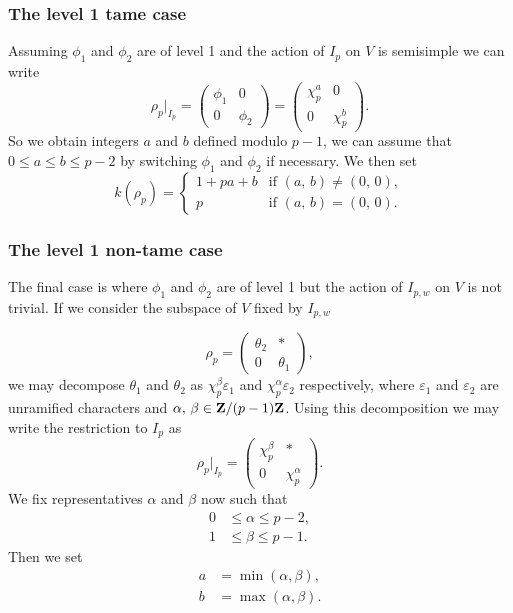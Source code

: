 \documentclass[a4paper,12pt]{article}
\begin{document}
\subsubsection{The level 1 tame case}\label{sec:l1t}
Assuming $\phi_1$ and $\phi_2$ are of level 1 and the action of $I_p$ on $V$ is semisimple we can write
\[
\rho_p |_{I_p} = \begin{pmatrix}
\phi_1 & 0 \\
0      & \phi_2 \end{pmatrix} = \begin{pmatrix}
\chi_p^a & 0 \\
0      & \chi_p^b \end{pmatrix}.
\]
So we obtain integers $a$ and $b$ defined modulo $p-1$, we can assume that $0\le a \le b \le p-2$ by switching $\phi_1$ and $\phi_2$ if necessary.
We then set
\begin{equation}\label{eq:l1t}
k(\rho_p) = \begin{cases}
1 + pa + b & \text{if }(a,\,b) \ne (0,\,0), \\
         p & \text{if }(a,\,b) = (0,\,0).
\end{cases}
\end{equation}


\subsubsection{The level 1 non-tame case}\label{sec:l1nt}
The final case is where $\phi_1$ and $\phi_2$ are of level 1 but the action of $I_{p,w}$ on $V$ is not trivial.
If we consider the subspace of $V$ fixed by $I_{p,w}$

\[
\rho_p = \begin{pmatrix}
\theta_2 & * \\
0        & \theta_1 \end{pmatrix},
\]
we may decompose $\theta_1$ and $\theta_2$ as $\chi_p^\beta \varepsilon_1$ and $\chi_p^\alpha \varepsilon_2$ respectively, where $\varepsilon_1$ and $\varepsilon_2$ are unramified characters and $\alpha,\,\beta \in \mathbf{Z}/(p-1)\mathbf{Z}$.
Using this decomposition we may write the restriction to $I_p$ as
\[
\rho_p|_{I_p} = \begin{pmatrix}
\chi_p^\beta & * \\
0          & \chi_p^\alpha \end{pmatrix}.
\]
We fix representatives $\alpha$ and $\beta$ now such that
\begin{align*}
0&\le \alpha \le p - 2,\\
1&\le \beta \le p - 1.
\end{align*}
Then we set
\begin{align*}
a &= \min(\alpha, \beta),\\
b &= \max(\alpha, \beta).
\end{align*}
\end{document}

